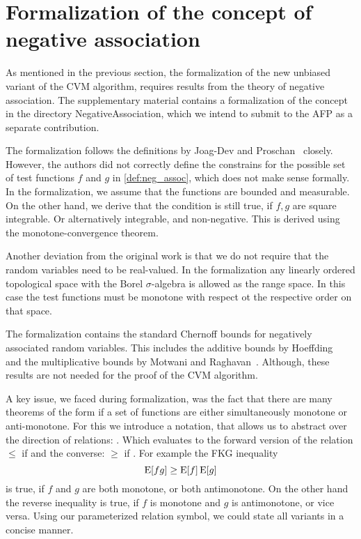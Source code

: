 \section{Formalization of the concept of negative association}\label{sec:formalization_neg_dep}
As mentioned in the previous section, the formalization of the new unbiased variant of the CVM algorithm, requires results from the theory of negative association.
The supplementary material contains a formalization of the concept in the directory Negative{\textunderscore}Association, which we intend to submit to the AFP as a separate contribution.

The formalization follows the definitions by Joag-Dev and Proschan~\cite{joagdev1983} closely.
However, the authors did not correctly define the constrains for the possible set of test functions $f$ and $g$ in \cref{def:neg_assoc}, which does not make sense formally.
In the formalization, we assume that the functions are bounded and measurable.
On the other hand, we derive that the condition is still true, if $f, g$ are square integrable.
Or alternatively integrable, and non-negative.
This is derived using the monotone-convergence theorem.

Another deviation from the original work is that we do not require that the random variables need to be real-valued.
In the formalization any linearly ordered topological space with the Borel $\sigma$-algebra is allowed as the range space.
In this case the test functions must be monotone with respect ot the respective order on that space.

The formalization contains the standard Chernoff bounds for negatively associated random variables.
This includes the additive bounds by Hoeffding~\cite[Th. 1, 2]{hoeffding1963} and the multiplicative bounds by Motwani and Raghavan~\cite[Th. 4.1, 4.2]{motwani1995}.
Although, these results are not needed for the proof of the CVM algorithm.

A key issue, we faced during formalization, was the fact that there are many theorems of the form if a set of functions are either simultaneously monotone or anti-monotone.
For this we introduce a notation, that allows us to abstract over the direction of relations: \isa{\isasymle\isasymge\isactrlbsub\isasymeta\isactrlesub}.
Which evaluates to the forward version of the relation $\leq$ if  and the converse: $\geq$ if .
For example the FKG inequality
\[
  \operatorname{\mathrm{E}} [f g] \geq \operatorname{\mathrm{E}} [f] \operatorname{\mathrm{E}} [g]
\]
is true, if $f$ and $g$ are both monotone, or both antimonotone.
On the other hand the reverse inequality is true, if $f$ is monotone and $g$ is antimonotone, or vice versa.
Using our parameterized relation symbol, we could state all variants in a concise manner.



